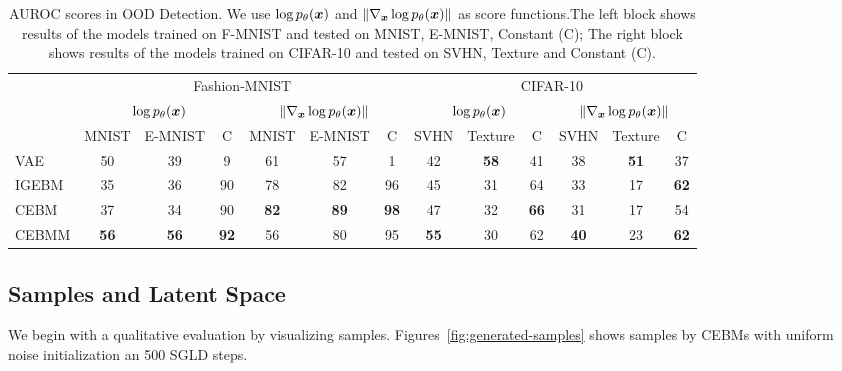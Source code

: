 \documentclass[tablecaption=bottom,wcp]{jmlr} %
\begin{document}
\setlength{\tabcolsep}{4pt}
\begin{table}[!h]
\scriptsize
\centering
\begin{tabular}{l|ccc|ccc||ccc|ccc}
\toprule
& \multicolumn{6}{c||}{Fashion-MNIST} &    \multicolumn{6}{c}{CIFAR-10}\\
& \multicolumn{3}{c|}{$\log p_{\theta}(\boldsymbol{x})$} & \multicolumn{3}{c||}{$\| \nabla_{\boldsymbol{x}}\log p_{\theta}(\boldsymbol{x})\|$} &  \multicolumn{3}{c|}{$\log p_{\theta}(\boldsymbol{x})$} & \multicolumn{3}{c}{$\| \nabla_{\boldsymbol{x}}\log p_{\theta}(\boldsymbol{x})\|$}\\
\midrule
            &  MNIST  & E-MNIST& C &  MNIST & E-MNIST & C &  SVHN & Texture & C &  SVHN & Texture & C \\
\midrule
VAE         & 50 & 39 & 9 & 61 & 57 & 1  & 42 & \textbf{58} & 41 & 38 & \textbf{51} & 37 \\
IGEBM       & 35 & 36 & 90 & 78 & 82 & 96& 45 & 31 & 64 & 33 & 17 & \textbf{62} \\
CEBM        & 37 & 34 & 90 & \textbf{82} & \textbf{89} & \textbf{98} & 47 & 32 & \textbf{66} & 31 & 17 & 54 \\
CEBMM       & \textbf{56} & \textbf{56} & \textbf{92} & 56 & 80 & 95     & \textbf{55} & 30 & 62 & \textbf{40} & 23 & \textbf{62}  \\
\bottomrule
\end{tabular}
\caption{AUROC scores in OOD Detection. We use $\log p_{\theta}(\boldsymbol{x})$ and $\| \nabla_{\boldsymbol{x}}\log p_{\theta}(\boldsymbol{x})\|$ as score functions.The left block shows results of the models trained on F-MNIST and tested on MNIST, E-MNIST, Constant (C); The right block shows results of the models trained on CIFAR-10 and tested on SVHN, Texture and Constant (C).}
\label{tab:ood-detection}
\end{table}

\subsection{Samples and Latent Space}
\label{sec:exp:quality}
\vspace*{-1.5ex}
We begin with a qualitative evaluation by visualizing samples. Figures~\ref{fig:generated-samples} shows samples by CEBMs with uniform noise initialization an 500 SGLD steps. 
\end{document}
